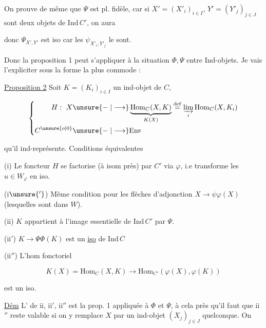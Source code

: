 
On prouve de même que $\Psi$ est pl. fidèle, car si $X'=(X'_i)_{i\in I}$, $Y'=(Y'_j)_{j\in J}$ sont deux objets de $\mathrm{Ind}\,C'$, on aura


 donc $\Psi_{X',Y'}$ est iso car les $\psi_{X'_i,Y'_j}$ le sont.

Donc la proposition 1 peut s'appliquer à la situation \deleted{$\unsure{\Phi,\Psi}$} $\Phi,\Psi$ entre Ind-objets. Je vais l'expliciter sous la forme la plus commode :

\uline{Proposition 2} Soit $K=(K_i)_{i\in I}$ un ind-objet de $C$,  

\[
 \left\{\begin{aligned}
 H:\ X&\unsure{\relbar|\longrightarrow}\underbrace{\mathrm{Hom}_C(X,K)}_{K(X)}
 \overset{\mathrm{def}}{=}\varinjlim_i\mathrm{Hom}_C(X,K_i)\\
 C^{\unsure{o|0}}&\unsure{\relbar|\longrightarrow}\mathrm{Ens}
 \end{aligned}\right.
\]

qu'il ind-représente. Conditions équivalentes

(i) Le foncteur $H$ se factorise (à isom près) par $C'$ via $\varphi$, i.e transforme les $u\in W_\varphi$ en iso.

(i$\unsure{'}$) Même condition pour les flèches d'adjonction $X\to\psi\varphi(X)$ (lesquelles sont dans $W$).


(ii) $K$ appartient à l'image essentielle de $\mathrm{Ind}\,C'$ par $\Psi$.

(ii$'$) $K\longrightarrow\Psi\Phi(K)$ est un \uline{iso} de $\mathrm{Ind}\,C$

(ii$''$) L'hom fonctoriel

\[
 K(X)=\mathrm{Hom}_C(X,K)\longrightarrow\mathrm{Hom}_{C'}(\varphi(X),\varphi(K))
\]

est un iso.

\uline{Dém} L' de ii, ii$'$, ii$''$ est la prop. 1 appliquée à $\Phi$ et $\Psi$,  à cela près qu'il faut  que ii$''$ reste  valable si on y remplace $X$ par un ind-objet $(X_j)_{j\in J}$ quelconque. On

